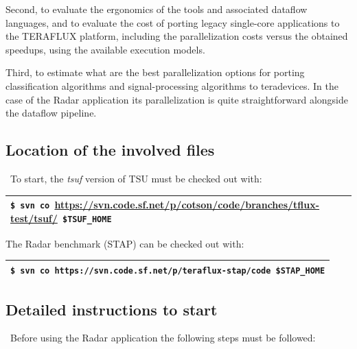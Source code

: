 \documentclass[a4paper]{article}
\begin{document}
{
Second, to evaluate the ergonomics of the tools and associated dataflow
languages, and to evaluate the cost of porting legacy single-core
applications to the TERAFLUX platform, including the parallelization
costs versus the obtained speedups, using the available execution
models.}

{
Third, to estimate what are the best parallelization options for porting
classification algorithms and signal-processing algorithms to
teradevices. In the case of the Radar application its parallelization
is quite straightforward alongside the dataflow pipeline.}

\subsection[Location of the involved files]{Location of the involved
files}
{
\ To start, the \textit{tsuf} version of TSU must be checked out with:}

\begin{flushleft}
\tablehead{}
\begin{supertabular}{|m{6.29346in}|}
\hline
{} \texttt{\$ svn co
}\url{https://svn.code.sf.net/p/cotson/code/branches/tflux-test/tsuf/}\texttt{
\$TSUF\_HOME}\\\hline
\end{supertabular}
\end{flushleft}
{
The Radar benchmark (STAP) can be checked out with:}

\begin{flushleft}
\tablehead{}
\begin{supertabular}{|m{6.29346in}|}
\hline
{} \texttt{\$ svn co
https://svn.code.sf.net/p/teraflux-stap/code \$STAP\_HOME}\\\hline
\end{supertabular}
\end{flushleft}
\subsection[Detailed instructions to start]{Detailed instructions to
start}
{
\ Before using the Radar application the following steps must be
followed:}
\end{document}
